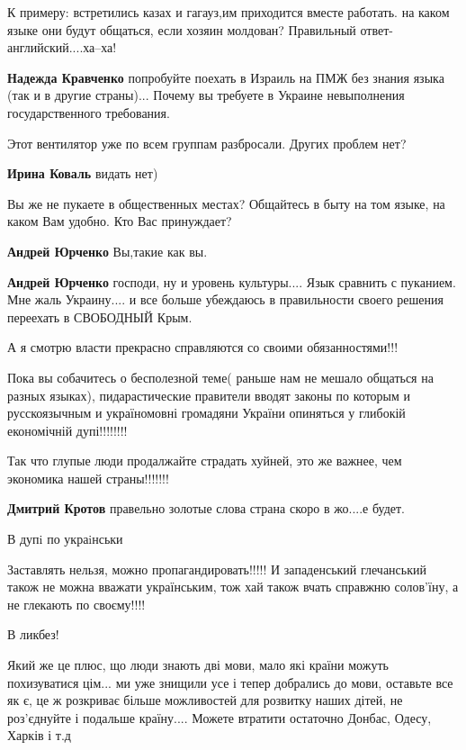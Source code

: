 \begin{itemize}
\begin{itemize}
К примеру: встретились казах и гагауз,им приходится вместе работать. на каком
языке они будут общаться, если хозяин молдован? Правильный ответ-
английский....ха--ха!

\textbf{Надежда Кравченко} попробуйте поехать в Израиль на ПМЖ без знания языка
(так и в другие страны)... Почему вы требуете в Украине невыполнения
государственного требования.
\end{itemize}

Этот вентилятор уже по всем группам разбросали. Других проблем нет?

\textbf{Ирина Коваль} видать нет)

Вы же не пукаете в общественных местах? Общайтесь в быту на том языке, на каком Вам удобно. Кто Вас принуждает?

\textbf{Андрей Юрченко} Вы,такие как вы.

\textbf{Андрей Юрченко} господи, ну и уровень культуры.... Язык сравнить с
пуканием. Мне жаль Украину.... и все больше убеждаюсь в правильности своего
решения переехать в СВОБОДНЫЙ Крым.


А я смотрю власти прекрасно справляются со своими обязанностями!!!

Пока вы собачитесь о бесполезной теме( раньше нам не мешало общаться на разных
языках), пидарастические правители вводят законы по которым и русскоязычным и
україномовні громадяни України опиняться у глибокій економічній дупі!!!!!!!!

Так что глупые люди продалжайте страдать хуйней, это же важнее, чем экономика
нашей страны!!!!!!!

\textbf{Дмитрий Кротов} правельно золотые слова страна скоро в жо....е будет.


В дупi по украiнськи

Заставлять нельзя, можно пропагандировать!!!!!
И западенський глечанський також не можна вважати українським, тож хай також вчать справжню солов'їну, а не глекають по своєму!!!!

В ликбез!


Який же це плюс, що люди знають дві мови, мало які країни можуть похизуватися
цім... ми уже знищили усе і тепер добрались до мови, оставьте все як є, це ж
розкриває більше можливостей для розвитку наших дітей, не роз'єднуйте і
подальше країну.... Можете втратити остаточно Донбас, Одесу, Харків і т.д


\end{itemize}
